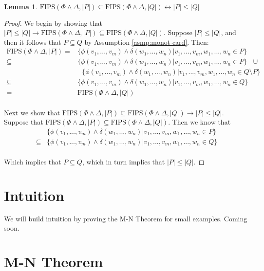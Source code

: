 \documentclass[12pt]{article}
\theoremstyle{definition}
\newtheorem{lemma}{Lemma}
\theoremstyle{remark}
\newcommand{\msp}{\text{ }}
\newcommand{\fips}{\text{FIPS}}
\begin{document}
\begin{lemma}
  \label{lem:fips-subset}
  $\fips(\Phi \land \Delta, |P|) \subseteq \fips(\Phi \land \Delta, |Q|) \leftrightarrow |P| \leq |Q|$
\end{lemma}
\begin{proof}
  We begin by showing that $|P| \leq |Q| \rightarrow \fips(\Phi \land \Delta, |P|) \subseteq \fips(\Phi \land \Delta, |Q|)$.  Suppose $|P| \leq |Q|$, and then it follows that $P \subseteq Q$ by Assumption \ref{asmp:monot-card}.  Then:
  \begin{align*}
    \fips(\Phi \land \Delta, |P|) = &\{\phi(v_1,...,v_m) \land \delta(w_1,...,w_n) | v_1,...,v_m,w_1,...,w_n \in P\}\\
    \subseteq &\{\phi(v_1,...,v_m) \land \delta(w_1,...,w_n) | v_1,...,v_m,w_1,...,w_n \in P\} \msp \cup\\
              &\msp \{\phi(v_1,...,v_m) \land \delta(w_1,...,w_n) | v_1,...,v_m,w_1,...,w_n \in Q \setminus P\}\\
    \subseteq &\{\phi(v_1,...,v_m) \land \delta(w_1,...,w_n) | v_1,...,v_m,w_1,...,w_n \in Q\}\\
    = &\fips(\Phi \land \Delta, |Q|)\\
  \end{align*}

  Next we show that $\fips(\Phi \land \Delta, |P|) \subseteq \fips(\Phi \land \Delta, |Q|) \rightarrow |P| \leq |Q|$.  Suppose that $\fips(\Phi \land \Delta, |P|) \subseteq \fips(\Phi \land \Delta, |Q|)$.  Then we know that 
  \begin{align*}
    &\{\phi(v_1,...,v_m) \land \delta(w_1,...,w_n) | v_1,...,v_m,w_1,...,w_n \in P\}\\
    \subseteq &\{\phi(v_1,...,v_m) \land \delta(w_1,...,w_n) | v_1,...,v_m,w_1,...,w_n \in Q\}\\
  \end{align*}

  Which implies that $P \subseteq Q$, which in turn implies that $|P| \leq |Q|$.

\end{proof}


\section{Intuition}
We will build intuition by proving the M-N Theorem for small examples.  Coming soon.


\section{M-N Theorem}
\end{document}
